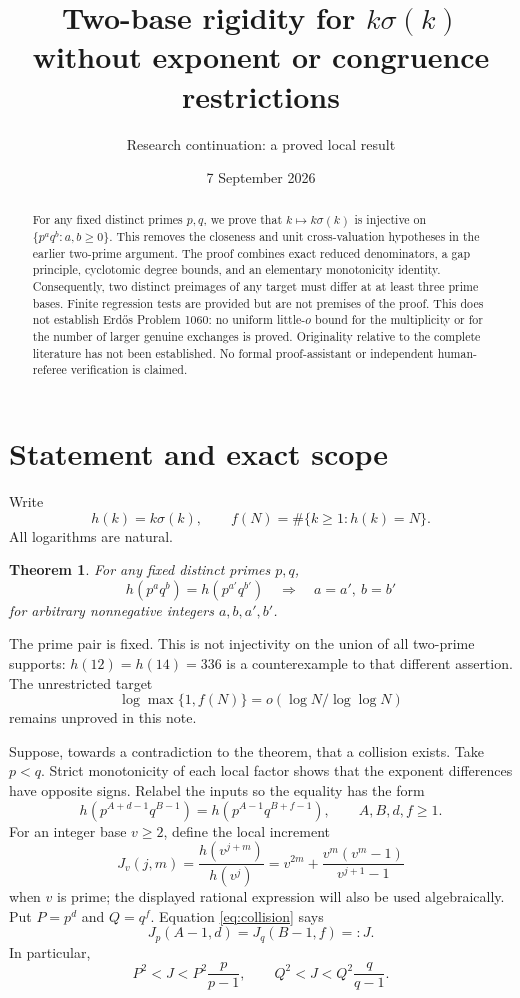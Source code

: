 \documentclass[11pt]{article}
\title{Two-base rigidity for \texorpdfstring{$k\sigma(k)$}{k sigma(k)}\\without exponent or congruence restrictions}
\author{Research continuation: a proved local result}
\date{7 September 2026}
\newtheorem{theorem}{Theorem}[section]
\begin{document}
\maketitle
\begin{abstract}
For any fixed distinct primes $p,q$, we prove that $k\mapsto k\sigma(k)$ is injective on $\{p^a q^b:a,b\ge0\}$. This removes the closeness and unit cross-valuation hypotheses in the earlier two-prime argument. The proof combines exact reduced denominators, a gap principle, cyclotomic degree bounds, and an elementary monotonicity identity. Consequently, two distinct preimages of any target must differ at at least three prime bases. Finite regression tests are provided but are not premises of the proof. This does not establish Erd\H{o}s Problem 1060: no uniform little-$o$ bound for the multiplicity or for the number of larger genuine exchanges is proved. Originality relative to the complete literature has not been established. No formal proof-assistant or independent human-referee verification is claimed.
\end{abstract}

\section{Statement and exact scope}
Write
\[
 h(k)=k\sigma(k),\qquad f(N)=\#\{k\ge1:h(k)=N\}.
\]
All logarithms are natural.
\begin{theorem}\label{thm:main}
For any fixed distinct primes $p,q$,
\[
 \boxed{h(p^a q^b)=h(p^{a'}q^{b'})
 \quad\Longrightarrow\quad a=a',\ b=b'}
\]
for arbitrary nonnegative integers $a,b,a',b'$.
\end{theorem}
The prime pair is fixed. This is not injectivity on the union of all two-prime supports: $h(12)=h(14)=336$ is a counterexample to that different assertion. The unrestricted target
\[
 \log\max\{1,f(N)\}=o(\log N/\log\log N)
\]
remains unproved in this note.

Suppose, towards a contradiction to the theorem, that a collision exists. Take $p<q$. Strict monotonicity of each local factor shows that the exponent differences have opposite signs. Relabel the inputs so the equality has the form
\begin{equation}\label{eq:collision}
 h(p^{A+d-1}q^{B-1})=h(p^{A-1}q^{B+f-1}),
 \qquad A,B,d,f\ge1.
\end{equation}
For an integer base $v\ge2$, define the local increment
\[
 J_v(j,m)=\frac{h(v^{j+m})}{h(v^j)}
 =v^{2m}+\frac{v^m(v^m-1)}{v^{j+1}-1}
\]
when $v$ is prime; the displayed rational expression will also be used algebraically. Put $P=p^d$ and $Q=q^f$. Equation \eqref{eq:collision} says
\begin{equation}\label{eq:J}
 J_p(A-1,d)=J_q(B-1,f)=:J.
\end{equation}
In particular,
\begin{equation}\label{eq:interval}
 P^2<J<P^2\frac p{p-1},\qquad
 Q^2<J<Q^2\frac q{q-1}.
\end{equation}
\end{document}
